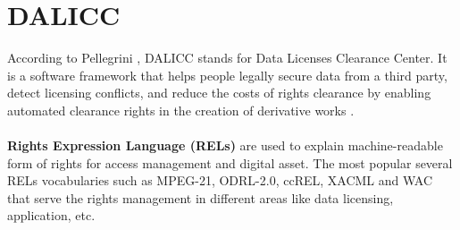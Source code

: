 \chapter{DALICC}
According to Pellegrini \cite{Tassilo}, DALICC stands for Data Licenses Clearance Center. It is a software framework that helps people legally secure data from a third party, detect licensing conflicts, and reduce the costs of rights clearance by enabling automated clearance rights in the creation of derivative works \cite{Tassilo}. \\
\\
\textbf{Rights Expression Language (RELs)} are used to explain machine-readable form of rights for access management and digital asset. The most popular  several RELs vocabularies  such as MPEG-21, ODRL-2.0, ccREL, XACML and WAC that serve the rights management in different areas like data licensing, application, etc\cite{Anna}.\\
\\
